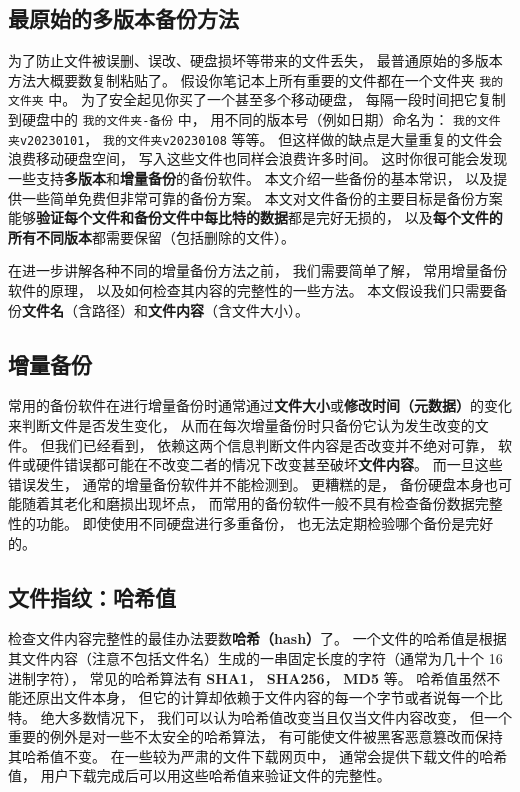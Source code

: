 

\subsection{最原始的多版本备份方法}
为了防止文件被误删、误改、硬盘损坏等带来的文件丢失， 最普通原始的多版本方法大概要数复制粘贴了。 假设你笔记本上所有重要的文件都在一个文件夹 \verb|我的文件夹| 中。 为了安全起见你买了一个甚至多个移动硬盘， 每隔一段时间把它复制到硬盘中的 \verb|我的文件夹-备份| 中， 用不同的版本号（例如日期）命名为： \verb|我的文件夹v20230101|， \verb|我的文件夹v20230108| 等等。 但这样做的缺点是大量重复的文件会浪费移动硬盘空间， 写入这些文件也同样会浪费许多时间。 这时你很可能会发现一些支持\textbf{多版本}和\textbf{增量备份}的备份软件。 本文介绍一些备份的基本常识， 以及提供一些简单免费但非常可靠的备份方案。 本文对文件备份的主要目标是备份方案能够\textbf{验证每个文件和备份文件中每比特的数据}都是完好无损的， 以及\textbf{每个文件的所有不同版本}都需要保留（包括删除的文件）。

在进一步讲解各种不同的增量备份方法之前， 我们需要简单了解， 常用增量备份软件的原理， 以及如何检查其内容的完整性的一些方法。 本文假设我们只需要备份\textbf{文件名}（含路径）和\textbf{文件内容}（含文件大小）。

\subsection{增量备份}
常用的备份软件在进行增量备份时通常通过\textbf{文件大小}或\textbf{修改时间（元数据）}的变化来判断文件是否发生变化， 从而在每次增量备份时只备份它认为发生改变的文件。 但我们已经看到， 依赖这两个信息判断文件内容是否改变并不绝对可靠， 软件或硬件错误都可能在不改变二者的情况下改变甚至破坏\textbf{文件内容}。 而一旦这些错误发生， 通常的增量备份软件并不能检测到。 更糟糕的是， 备份硬盘本身也可能随着其老化和磨损出现坏点， 而常用的备份软件一般不具有检查备份数据完整性的功能。 即使使用不同硬盘进行多重备份， 也无法定期检验哪个备份是完好的。

\subsection{文件指纹：哈希值}
检查文件内容完整性的最佳办法要数\textbf{哈希（hash）}了。 一个文件的哈希值是根据其文件内容（注意不包括文件名）生成的一串固定长度的字符（通常为几十个 16 进制字符）， 常见的哈希算法有 \textbf{SHA1}， \textbf{SHA256}， \textbf{MD5} 等。 哈希值虽然不能还原出文件本身， 但它的计算却依赖于文件内容的每一个字节或者说每一个比特。 绝大多数情况下， 我们可以认为哈希值改变当且仅当文件内容改变， 但一个重要的例外是对一些不太安全的哈希算法， 有可能使文件被黑客恶意篡改而保持其哈希值不变。 在一些较为严肃的文件下载网页中， 通常会提供下载文件的哈希值， 用户下载完成后可以用这些哈希值来验证文件的完整性。

